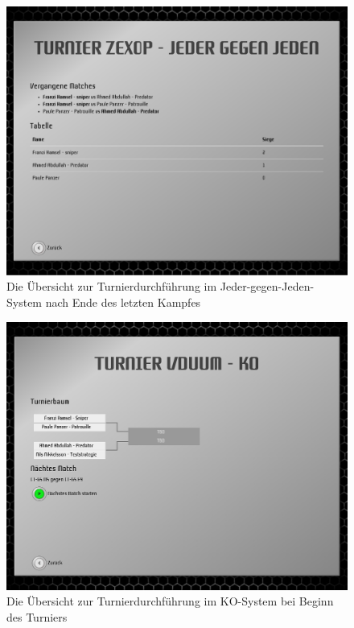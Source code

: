 \begin{figure}
  \centering
  \label{tournament-execution-end}
  \includegraphics[width=15cm, keepaspectratio]{figures/15-turnierdurchfuehrung-ende.png}
  \caption{Die Übersicht zur Turnierdurchführung im Jeder-gegen-Jeden-System nach Ende des letzten Kampfes}
\end{figure}

\begin{figure}
  \centering
  \label{tournament-execution-ko-start}
  \includegraphics[width=15cm, keepaspectratio]{figures/16-turnierdurchfuehrung-ko-start.png}
  \caption{Die Übersicht zur Turnierdurchführung im KO-System bei Beginn des Turniers}
\end{figure}

